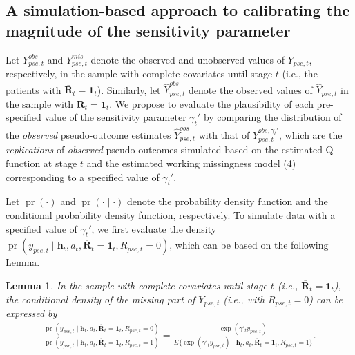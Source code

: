\documentclass[12pt]{article}
\DeclareMathOperator{\pr}{pr}
\newtheorem{lemma}{Lemma}[]
\begin{document}
\subsection{A simulation-based approach to calibrating the magnitude of the sensitivity parameter}
Let $Y_{pse,t}^{obs}$ and $Y_{pse,t}^{mis}$ denote the observed and unobserved values of $Y_{pse,t}$, respectively, in the sample with complete covariates until stage $t$ (i.e., the patients with $\overline{\bm{R}}_t = \bm{1}_t$). Similarly, let $\widehat{Y}_{pse,t}^{obs}$ denote the observed values of $\widehat{Y}_{pse,t}$ in the sample with $\overline{\bm{R}}_t = \bm{1}_t$.  We propose to  evaluate the plausibility of  each pre-specified value of the sensitivity parameter $\gamma_t'$ by comparing the distribution of the \textit{observed} pseudo-outcome estimates $\widehat{Y}_{pse,t}^{obs}$ with that of $Y_{pse,t}^{obs,\gamma_t'}$, which are the \textit{replications}  of \textit{observed} pseudo-outcomes simulated based on the estimated Q-function at stage $t$ and the estimated working missingness model (4) corresponding to   a specified value of $\gamma_t'$.  


Let $\pr(\cdot)$ and $\pr( \cdot\mid\cdot )$ denote the probability density function and the conditional probability density function, respectively. To simulate data with a specified value of   $\gamma_t'$, we first evaluate the density $\pr(y_{pse,t}\mid \bm{h}_t,a_t,\overline{\bm{R}}_t = \bm{1}_t,R_{pse,t}=0)$, which can be based on  the following Lemma. 
\begin{lemma}
    In the sample with complete covariates until stage $t$ (i.e., $\overline{\bm{R}}_t = \bm{1}_t$), the conditional density of the missing part of $Y_{pse,t}$ (i.e., with $R_{pse,t}=0$) can be expressed by
    \begin{align}
    \frac{\pr(y_{pse,t}\mid \bm{h}_t,a_t,\overline{\bm{R}}_t = \bm{1}_t,R_{pse,t}=0)}{\pr(y_{pse,t}\mid \bm{h}_t,a_t,\overline{\bm{R}}_t = \bm{1}_t,R_{pse,t}=1)} = \frac{\exp(\gamma'_t y_{pse,t})}{E\{\exp(\gamma'_t y_{pse,t}) \mid \bm{h}_t,a_t,\overline{\bm{R}}_t = \bm{1}_t, R_{pse,t}=1\}}. \label{pseudo-obs-mis}
\end{align}
\end{lemma}
\end{document}
